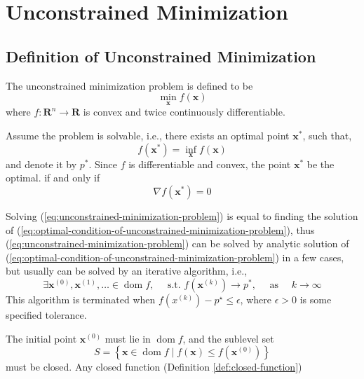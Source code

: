 \chapter{Unconstrained Minimization}

\section{Definition of Unconstrained Minimization}

\begin{definition}
	The unconstrained minimization problem is defined to be
	\begin{equation}
		\min_{\mathbf{x}}f(\mathbf{x})
		\label{eq:unconstrained-minimization-problem}
	\end{equation}
	where $f:\mathbf{R}^n\rightarrow\mathbf{R}$ is convex and twice continuously differentiable.
\end{definition}

Assume the problem is solvable, i.e., there exists an optimal point $\mathbf{x}^{*}$, such that,
\begin{equation*}
	f(\mathbf{x}^{*})=\inf_{\mathbf{x}}f(\mathbf{x})
\end{equation*}
and denote it by $p^{*}$. Since $f$ is differentiable and convex, the point $\mathbf{x}^{*}$ be the optimal. if and only if
\begin{equation}
	\nabla f(\mathbf{x}^{*})=0
	\label{eq:optimal-condition-of-unconstrained-minimization-problem}
\end{equation}

Solving (\ref{eq:unconstrained-minimization-problem}) is equal to finding the solution of (\ref{eq:optimal-condition-of-unconstrained-minimization-problem}), thus (\ref{eq:unconstrained-minimization-problem}) can be solved by analytic solution of (\ref{eq:optimal-condition-of-unconstrained-minimization-problem}) in a few cases, but usually can be solved by an iterative algorithm, i.e.,
\begin{equation*}
	\exists\mathbf{x}^{(0)},\mathbf{x}^{(1)},\ldots\in\operatorname{dom}f,\quad\text{ s.t. }f(\mathbf{x}^{(k)})\rightarrow p^{*},\quad\text{ as }\quad k\rightarrow\infty
\end{equation*}
This algorithm is terminated when $f\left(x^{(k)}\right)-p^{\star}\leq\epsilon$, where $\epsilon>0$ is some specified tolerance.

\begin{remark}
	The initial point $\mathbf{x}^{(0)}$ must lie in $\operatorname{dom}f$, and the sublevel set
	\begin{equation*}
		S=\left\{\mathbf{x}\in\operatorname{dom}f\mid f(\mathbf{x})\leq f(\mathbf{x}^{(0)})\right\}
	\end{equation*}
	must be closed. Any closed function (Definition \ref{def:closed-function})
\end{remark}

